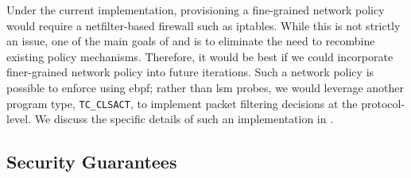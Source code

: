 Under the current implementation, provisioning a fine-grained network policy would require
a netfilter-based firewall such as iptables. While this is not strictly an issue, one of
the main goals of \bpfbox{} and \bpfcontain{} is to eliminate the need to recombine
existing policy mechanisms. Therefore, it would be best if we could incorporate
finer-grained network policy into future iterations. Such a network policy is possible to
enforce using \gls{ebpf}; rather than \gls{lsm} probes, we would leverage another program
type, \texttt{TC\_CLSACT}, to implement packet filtering decisions at the protocol-level.
We discuss the specific details of such an implementation in
.


\subsection{Security Guarantees}




